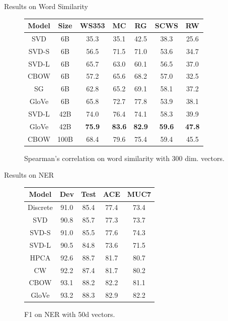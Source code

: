 \begin{frame}{Results on Word Similarity}
  \begin{figure}
    \begin{tabular}{|cc|ccccc|}
      \hline
      Model & Size & WS353 & MC & RG & SCWS & RW\\
      \hline
      SVD & 6B & 35.3 & 35.1 & 42.5 & 38.3 & 25.6 \\
      SVD-S & 6B & 56.5 & 71.5 & 71.0 & 53.6 & 34.7\\
      \alert<2->{SVD-L} & 6B & 65.7 & 63.0 & 60.1 & 56.5 & 37.0\\
      CBOW & 6B & 57.2 & 65.6 & 68.2 & 57.0 & 32.5\\
      SG & 6B & 62.8 & 65.2 & 69.1 & 58.1 & 37.2\\
      GloVe & 6B & 65.8 & 72.7 & 77.8 & 53.9 & 38.1\\
      \hline
      \alert<3->{SVD-L} & 42B & 74.0 & 76.4 & 74.1 & 58.3 & 39.9\\
      GloVe & 42B & {\bf 75.9} & {\bf 83.6} & {\bf 82.9} & {\bf 59.6} & {\bf 47.8}\\
      \hline
      CBOW & 100B & 68.4 & 79.6 & 75.4 & 59.4 & 45.5\\
      \hline
    \end{tabular}
    \caption{Spearman's correlation on word similarity with 300 dim. vectors.}
  \end{figure}
\end{frame}

\begin{frame}{Results on NER}
  \begin{figure}
    \begin{tabular}{|c|cccc|}
      \hline
      Model & Dev & Test & ACE & MUC7 \\
      \hline
      Discrete & 91.0 & 85.4 & 77.4 & 73.4\\
      SVD & 90.8 & 85.7 & 77.3 & 73.7\\
      SVD-S & 91.0 & 85.5 & 77.6 & 74.3\\
      SVD-L & 90.5 & 84.8 & 73.6 & 71.5\\
      HPCA & 92.6 & 88.7 & 81.7 & 80.7 \\
      CW & 92.2 & 87.4 & 81.7 & 80.2\\
      CBOW & 93.1 & 88.2 & 82.2 & 81.1\\
      GloVe & 93.2 & 88.3 & 82.9 & 82.2\\
      \hline
    \end{tabular}
    \caption{F1 on NER with 50d vectors.}
  \end{figure}
\end{frame}

